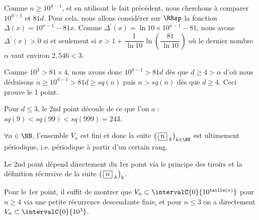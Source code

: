 \begin{proof*}
	Comme $n \geqslant 10^{d-1}$, et en utilisant le fait précédent, nous cherchons à comparer $10^{d-1}$ et $81d$.
	Pour cela, nous allons considérer sur $\RRsp$ la fonction $\Delta(x) = 10^{x-1} - 81x$. 
	Comme $\Delta^\prime(x) = \ln 10 \times 10^{x-1} - 81$,
	nous avons $\Delta^\prime(x) > 0$ 
	si et seulement si $x > 1 + \dfrac{1}{\, \ln 10 \,} \ln \left( \dfrac{81}{\, \ln 10 \,} \right)$
	où le dernier nombre $\alpha$ vaut environ $2,\!546 < 3$.


	\medskip
	
	Comme $10^3 > 81 \times 4$, nous avons donc  $10^{d-1} > 81d$ dès que $d \geqslant 4 > \alpha$
	d'où nous déduisons $n \geqslant 10^{d-1} > 81d \geqslant sq(n)$
	puis $n > sq(n)$ dès que $d \geqslant 4$. Ceci prouve le 1\ier{} point.


	\bigskip
	
	Pour $d \leqslant 3$, le 2nd point découle de ce que l'on a : $sq(9) < sq(99) < sq(999) = 243$.
\end{proof*}




\medskip

\begin{fact}
	$\forall n \in \NN$, l'ensemble $V_n$ est fini et donc la suite $\left( \, \sqseq{n}{k} \right)_{k \in \NN}$ est ultimement périodique, i.e. périodique à partir d'un certain rang.
\end{fact}

\begin{proof*}
	Le 2nd point dépend directement du 1er point via le principe des tiroirs et la définition récursive de la suite $\left( \, \fbox{$n$}_{\,\,k} \right)_k$.
	
	\medskip
	
	Pour le 1er point, il suffit de montrer que $V_n \subset \intervalC{0}{10^{\taille(n)}}$ pour $n \geqslant 4$ via une petite récurrence descendante finie, et pour $n \leqslant 3$ on a directement $V_n \subset \intervalC{0}{10^3}$.
\end{proof*}